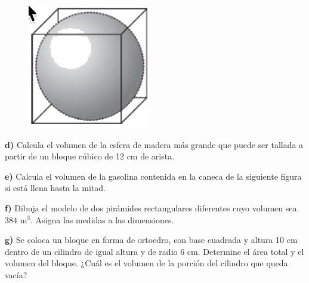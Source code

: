 \documentclass[12pt,a4paper]{article}
\begin{document}
\begin{multicols}{2}
\begin{figure}
	\centering
	\vspace{-10pt}
	\includegraphics[width=0.3\columnwidth]{Figuras/fig50.png}
	\vspace{-10pt}
\end{figure}
\textbf{d)} Calcula el volumen de la esfera de madera más grande que puede ser tallada a partir de un bloque cúbico de 12 cm de arista.

\vspace{2mm}

\textbf{e)} Calcula el volumen de la gasolina contenida en la caneca de la siguiente figura si está llena hasta la mitad.

\begin{center}
\end{center}

\textbf{f)} Dibuja el modelo de dos pirámides rectangulares diferentes cuyo volumen sea 384 m$^3$. Asigna las medidas a las dimensiones.

\textbf{g)} Se coloca un bloque en forma de ortoedro, con base cuadrada y altura 10 cm dentro de un cilindro de igual altura y de radio 6 cm. Determine el área total y el volumen del bloque. ¿Cuál es el volumen de la porción del cilindro que queda vacía?


\end{multicols}
\end{document}
